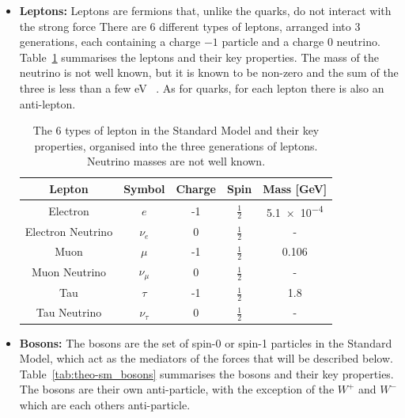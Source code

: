\begin{itemize}[leftmargin=*]
\item\textbf{Leptons:}
  Leptons are fermions that, unlike the quarks, do not interact with the strong force
  There are 6 different types of leptons,
  arranged into  3 generations, each containing a charge $-1$ particle and a charge 0 neutrino.
  Table~\ref{tab:theo-sm_leptons} summarises the leptons and their key properties.
  The mass of the neutrino is not well known, but it is known to be non-zero and the sum of the three is less than a few eV ~\cite{theo-nu_mass}.
  As for quarks, for each lepton there is also an anti-lepton.
\newpage
  {\renewcommand{\arraystretch}{1.5}
  \begin{table}[!ht]
  \begin{center}
    \begin{tabular}{|c||c|c|c|c|}
      \hline
    Lepton            & Symbol        & Charge  &  Spin           &  Mass [GeV]\\
    \hline
    Electron          &   $e$         &  -1    &  $\frac{1}{2}$   &  \num{5.1e-4}\\
    Electron Neutrino &   $\nu_e$     &  0     &  $\frac{1}{2}$   &  -\\
    \hline                                   
    Muon              &   $\mu$       &  -1    &  $\frac{1}{2}$   &  0.106 \\
    Muon Neutrino     &   $\nu_{\mu}$  &  0     &  $\frac{1}{2}$   &  -\\
    \hline                                      
    Tau               &   $\tau$       &  -1   &  $\frac{1}{2}$   &  1.8\\
    Tau Neutrino      &   $\nu_{\tau}$  &  0    &  $\frac{1}{2}$   &  -\\
    \hline  
  \end{tabular}
    \caption{The 6 types of lepton in the Standard Model and their key properties,
    organised into the three generations of leptons. Neutrino masses are not well known. }
  \label{tab:theo-sm_leptons}
  \end{center}
  \end{table}}
 
\item\textbf{Bosons:}
  The bosons are the set of spin-0 or spin-1 particles in the Standard Model,
  which act as the mediators of the forces that will be described below.
  Table~\ref{tab:theo-sm_bosons} summarises the bosons and their key properties.
  The bosons are their own anti-particle, with the exception of the $W^{+}$ and $W^{-}$
  which are each others anti-particle.


\end{itemize}
